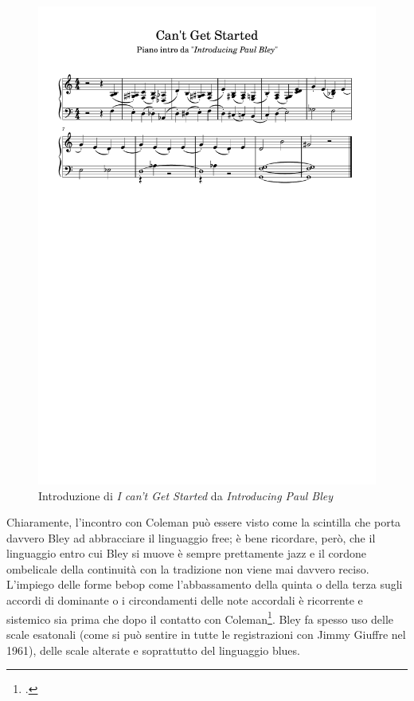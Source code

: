 \begin{figure}[H]
	\centering
	\includegraphics[clip,trim=1cm 18cm 1cm 4.3cm, width=\textwidth]{cantgetintro.pdf}
	\caption{Introduzione di \textit{I can't Get Started} da \textit{Introducing Paul Bley}}
	\label{fig:cant}
\end{figure}
Chiaramente, l'incontro con Coleman può essere visto come la scintilla che porta davvero Bley ad abbracciare il linguaggio free; è bene ricordare, però, che il linguaggio entro cui Bley si muove è sempre prettamente jazz e il cordone ombelicale della continuità con la tradizione non viene mai davvero reciso. L'impiego delle forme bebop come l'abbassamento della quinta o della terza sugli accordi di dominante o i circondamenti delle note accordali è ricorrente e sistemico sia prima che dopo il contatto con Coleman\footcite[26]{meehan}. Bley fa spesso uso delle scale esatonali (come si può sentire in tutte le registrazioni con Jimmy Giuffre nel 1961), delle scale alterate e soprattutto del linguaggio blues.\\
